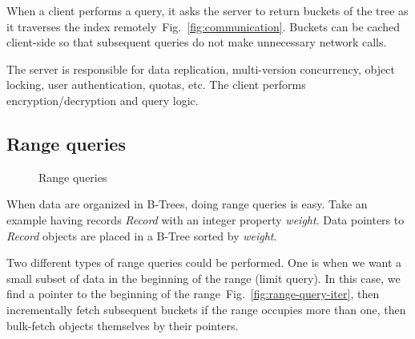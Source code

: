 \documentclass[notitlepage]{revtex4-1}
\newcommand{\figref}[1]{Fig.~\ref{#1}}
\begin{document}
When a client performs a query, it asks the server to return buckets of the tree as it traverses the index remotely~\figref{fig:communication}.
Buckets can be cached client-side so that subsequent queries do not make unnecessary network calls.

The server is responsible for data replication, multi-version concurrency, object locking, user authentication, quotas, etc.
The client performs encryption/decryption and query logic.

\subsection{Range queries}

\begin{figure}
	\begin{center}
        \qquad
	\end{center}
	\caption{Range queries}
	\label{fig:range-query}
\end{figure}

When data are organized in B-Trees, doing range queries is easy.
Take an example having records \emph{Record} with an integer property \emph{weight}.
Data pointers to \emph{Record} objects are placed in a B-Tree sorted by \emph{weight}.

Two different types of range queries could be performed.
One is when we want a small subset of data in the beginning of the range (limit query).
In this case, we find a pointer to the beginning of the range~\figref{fig:range-query-iter}, then incrementally fetch subsequent buckets if the range occupies more than one, then bulk-fetch objects themselves by their pointers.
\end{document}
